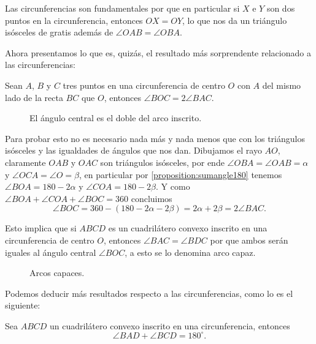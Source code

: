 Las circunferencias son fundamentales
por que en particular si $X$
e $Y$ son dos puntos en la circunferencia,
entonces $OX = OY$, lo que nos da un triángulo
isósceles de gratis además de $\angle OAB = \angle OBA$.

Ahora presentamos lo que es, quizás,
el resultado más sorprendente relacionado
a las circunferencias:

\begin{theorem}
	Sean $A$, $B$ y $C$ tres puntos en una circunferencia
	de centro $O$ con $A$ del mismo lado
	de la recta $BC$ que $O$,
	entonces $\angle BOC = 2\angle BAC$.
\end{theorem}

\begin{figure}[h]
	\begin{center}
		
	\end{center}
	\caption{El ángulo central es el doble del arco inscrito.}
\end{figure}

Para probar esto no es necesario nada
más y nada menos que con los triángulos isósceles
y las igualdades de ángulos que nos dan.
Dibujamos el rayo $AO$,
claramente $OAB$ y $OAC$ son triángulos isósceles,
por ende $\angle OBA = \angle OAB = \alpha$ y $\angle OCA = \angle O = \beta$,
en particular por \autoref{proposition:sumangle180}
tenemos $\angle BOA = 180 - 2\alpha$
y $\angle COA = 180 - 2\beta$.
Y como $\angle BOA + \angle COA + \angle BOC = 360$
concluimos
\[\angle BOC = 360 - (180 - 2\alpha - 2\beta) = 2\alpha + 2\beta = 2\angle BAC.\]

Esto implica que si $ABCD$ es un cuadrilátero convexo
inscrito en una circunferencia de centro $O$,
entonces $\angle BAC = \angle BDC$ por que
ambos serán iguales al ángulo central $\angle BOC$,
a esto se lo denomina arco capaz.

\begin{figure}[H]
	\begin{center}
		
	\end{center}
	\caption{Arcos capaces.}
\end{figure}

Podemos deducir más resultados respecto
a las circunferencias, como lo es el
siguiente:
\begin{theorem}
	Sea $ABCD$ un cuadrilátero convexo inscrito
	en una circunferencia, entonces
	\[\angle BAD + \angle BCD = 180^\circ.\]
\end{theorem}

